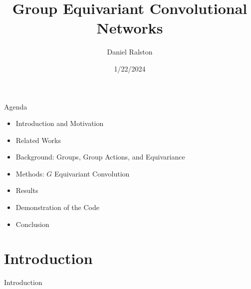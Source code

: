 \documentclass{beamer}
\title{Group Equivariant Convolutional Networks}
\author{Daniel Ralston}
\date{1/22/2024}
\begin{document}
\begin{frame}
  \titlepage
\end{frame}


\begin{frame}{Agenda}
    \begin{itemize}
        \item Introduction and Motivation
        \item Related Works
        \item Background: Groups, Group Actions, and Equivariance
        \item Methods: $G$ Equivariant Convolution
        \item Results
        \item Demonstration of the Code
        \item Conclusion
    \end{itemize}
\end{frame}

\section{Introduction}
\begin{frame}{Introduction}
\end{frame}

\end{document}
